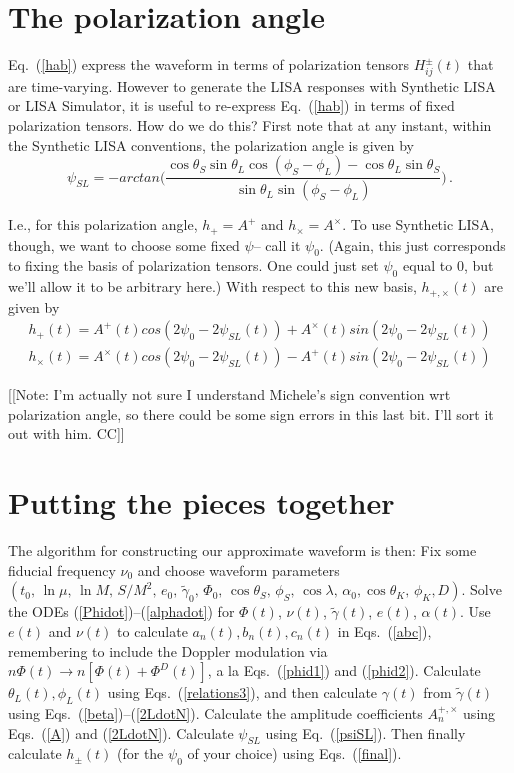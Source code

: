 \documentclass[11pt]{report}
\begin{document}
\section{The polarization angle}
Eq.~(\ref{hab}) express the waveform in terms of polarization tensors $H^{\pm}_{ij}(t)$ that
are time-varying.  However to generate the LISA responses with Synthetic LISA or
LISA Simulator, it is useful to re-express Eq.~(\ref{hab}) in terms of fixed polarization tensors.
How do we do this? First note that at any instant, within the Synthetic LISA conventions, the
polarization angle is given by 
\begin{equation}\label{psiSL}
\psi_{SL} = -arctan\bigl(\frac{\cos \theta_S \sin \theta_L \cos(\phi_S - \phi_L) - \cos\theta_L \sin\theta_S}{\sin\theta_L \sin(\phi_S-\phi_L)}\bigr) \,.
\end{equation}

I.e., for this polarization angle, $h_+ = A^+$  and  $h_{\times} = 
A^{\times}$.
To use Synthetic LISA, though, we want to choose some fixed $\psi$-- call it $\psi_0$. 
(Again, this just  corresponds to fixing the basis of polarization tensors.  One could just 
set $\psi_0$ equal to $0$, but we'll allow it to be arbitrary here.) With respect to this new
basis, $h_{+,\times}(t)$ are given by
\begin{eqnarray}\label{final}
h_+(t) = A^+(t) cos(2\psi_0 - 2\psi_{SL}(t) ) + A^{\times}(t) sin(2\psi_0 - 2\psi_{SL}(t) ) \nonumber \\
h_{\times}(t) = A^{\times}(t) cos(2\psi_0 - 2\psi_{SL}(t) ) - A^+(t) sin(2\psi_0 - 2\psi_{SL}(t) )
\end{eqnarray}

[[Note: I'm actually not sure I understand Michele's sign convention wrt polarization angle, so
there could be some sign errors in this last bit.  I'll sort it out with him. CC]]

\section{Putting the pieces together}

The algorithm for constructing our approximate waveform is then:
Fix some fiducial frequency $\nu_0$ and choose waveform parameters
$(t_0,\,\ln\mu,\,\ln M,\,S/M^2,\,e_0,\,\tilde\gamma_0,\,\Phi_0,\,\cos\theta_S,\,
\phi_S,\,\cos\lambda,\,\alpha_0,\cos\theta_K,\,\phi_K,D)$.
Solve the ODEs (\ref{Phidot})--(\ref{alphadot})
for $\Phi(t)$, $\nu(t)$, $\tilde\gamma(t)$, $e(t)$, $\alpha(t)$.
Use $e(t)$ and $\nu(t)$ to
calculate $a_n(t), b_n(t), c_n(t)$ in Eqs.~(\ref{abc}),
remembering to include the Doppler modulation via
$n\Phi(t)\to n[\Phi(t)+\Phi^D(t)]$, a la Eqs.~(\ref{phid1}) and (\ref{phid2}).
Calculate $\theta_L(t),\phi_L(t)$ using Eqs.~(\ref{relations3}), and then
calculate $\gamma(t)$ from $\tilde\gamma(t)$ using Eqs.~(\ref{beta})--(\ref{2LdotN}).
Calculate the amplitude coefficients $A_n^{+,\times}$  using Eqs.~(\ref{A}) and (\ref{2LdotN}).
Calculate $\psi_{SL}$ using Eq.~(\ref{psiSL}).
Then finally calculate $h_{\pm}(t)$ (for the $\psi_0$ of your choice) using
Eqs.~(\ref{final}).
\end{document}

